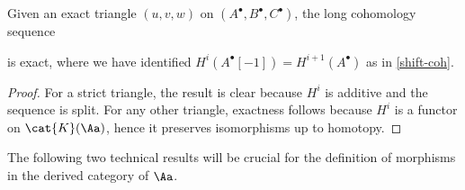 \begin{lemma}
    Given an exact triangle $(u,v,w)$ on 
    $(A^{\bullet}, B^{\bullet}, C^{\bullet})$,
    the long cohomology sequence
    \begin{center}
    \end{center}
    is exact, where we have identified
    $H^{i}(A^{\bullet}[-1]) = H^{i+1}(A^{\bullet})$
    as in \eqref{shift-coh}.
    \begin{proof}
        For a strict triangle, the result is
        clear because $H^{i}$ is additive 
        and the sequence is split.
        For any other triangle, exactness
        follows because $H^i$ is a functor on $\cat{K}(\Aa)$,
        hence it preserves isomorphisms up to homotopy.
    \end{proof}
\end{lemma}

The following two technical results will be crucial
for the definition of morphisms in the derived category
of $\Aa$.

